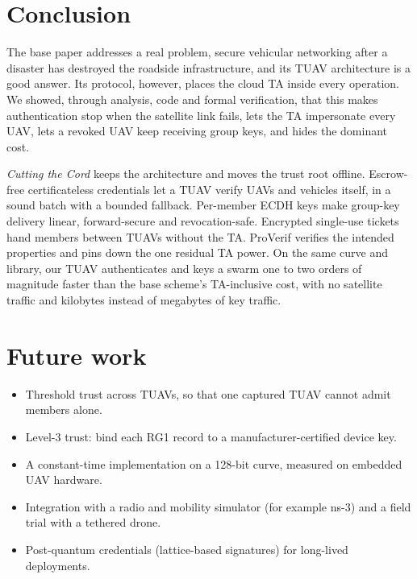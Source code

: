 \section{Conclusion}
The base paper addresses a real problem, secure vehicular networking after a disaster has destroyed the roadside infrastructure, and its TUAV
architecture is a good answer. Its protocol, however, places the cloud TA inside every operation. We showed, through analysis, code and formal verification,
that this makes authentication stop when the satellite link fails, lets the TA impersonate every UAV, lets a revoked UAV keep receiving group keys, and hides
the dominant cost.

\emph{Cutting the Cord} keeps the architecture and moves the trust root offline. Escrow-free certificateless credentials let a TUAV verify UAVs and
vehicles itself, in a sound batch with a bounded fallback. Per-member ECDH keys make group-key delivery linear, forward-secure and revocation-safe.
Encrypted single-use tickets hand members between TUAVs without the TA. ProVerif verifies the intended properties and pins down the one residual TA power.
On the same curve and library, our TUAV authenticates and keys a swarm one to two orders of magnitude faster than the base scheme's TA-inclusive cost,
with no satellite traffic and kilobytes instead of megabytes of key traffic.

\section{Future work}
\begin{itemize}
  \item Threshold trust across TUAVs, so that one captured TUAV cannot admit members alone.
  \item Level-3 trust: bind each RG1 record to a manufacturer-certified device key.
  \item A constant-time implementation on a 128-bit curve, measured on embedded UAV hardware.
  \item Integration with a radio and mobility simulator (for example ns-3) and a field trial with a tethered drone.
  \item Post-quantum credentials (lattice-based signatures) for long-lived deployments.
\end{itemize}
